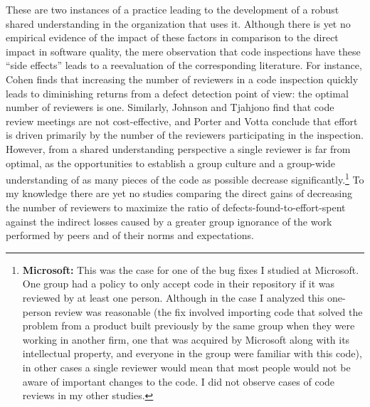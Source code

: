These are two instances of a practice leading to the development of a robust shared understanding in the organization that uses it. Although there is yet no empirical evidence of the impact of these factors in comparison to the direct impact in software quality, the mere observation that code inspections have these ``side effects'' leads to a reevaluation of the corresponding literature. For instance, Cohen  finds that increasing the number of reviewers in a code inspection quickly leads to diminishing returns from a defect detection point of view: the optimal number of reviewers is one. Similarly, Johnson and Tjahjono  find that code review meetings are not cost-effective, and Porter and Votta  conclude that effort is driven primarily by the number of the reviewers participating in the inspection. However, from a shared understanding perspective a single reviewer is far from optimal, as the opportunities to establish a group culture and a group-wide understanding of as many pieces of the code as possible decrease significantly.\footnote{\textbf{Microsoft:} This was the case for one of the bug fixes I studied at Microsoft. One group had a policy to only accept code in their repository if it was reviewed by at least one person. Although in the case I analyzed this one-person review was reasonable (the fix involved importing code that solved the problem from a product built previously by the same group when they were working in another firm, one that was acquired by Microsoft along with its intellectual property, and everyone in the group were familiar with this code), in other cases a single reviewer would mean that most people would not be aware of important changes to the code. I did not observe cases of code reviews in my other studies.} To my knowledge there are yet no studies comparing the direct gains of decreasing the number of reviewers to maximize the ratio of defects-found-to-effort-spent against the indirect losses caused by a greater group ignorance of the work performed by peers and of their norms and expectations.

